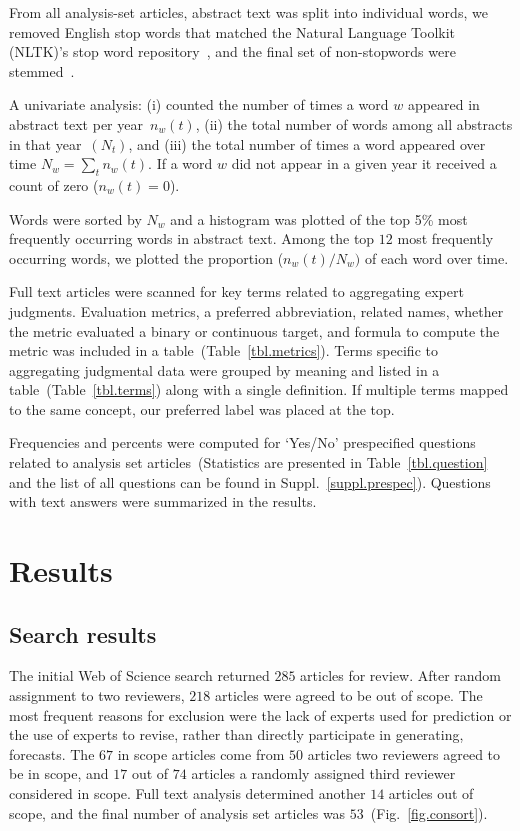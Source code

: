 \documentclass[preprint]{elsarticle}
\begin{document}
From all analysis-set articles, abstract text was split into individual words, we removed English stop words that matched the Natural Language Toolkit (NLTK)'s stop word repository~\cite{loper2002nltk}, and the final set of non-stopwords were stemmed~\cite{willett2006porter}.

A univariate analysis: (i) counted the number of times a word $w$ appeared in abstract text per year~$n_{w}(t)$, (ii) the total number of words among all abstracts in that year~$(N_{t})$, and (iii) the total number of times a word appeared over time $N_{w} = \sum_{t} n_{w}(t)$.
If a word $w$ did not appear in a given year it received a count of zero ($n_{w}(t)=0$).

Words were sorted by $N_{w}$ and a histogram was plotted of the top 5\% most frequently occurring words in abstract text.
Among the top $12$ most frequently occurring words, we plotted the proportion ($n_{w}(t)/N_{w})$ of each word over time.

Full text articles were scanned for key terms related to aggregating expert judgments.
Evaluation metrics, a preferred abbreviation, related names, whether the metric evaluated a binary or continuous target, and formula to compute the metric was included in a table~(Table~\ref{tbl.metrics}).  
Terms specific to aggregating judgmental data were grouped by meaning and listed in a table~(Table~\ref{tbl.terms}) along with a single definition.
If multiple terms mapped to the same concept, our preferred label was placed at the top. 

Frequencies and percents were computed for `Yes/No' prespecified questions related to analysis set articles~(Statistics are presented in Table~\ref{tbl.question} and the list of all questions can be found in Suppl.~\ref{suppl.prespec}).
Questions with text answers were summarized in the results. 

\section{Results}
\label{sec.results}

\subsection{Search results}

The initial Web of Science search returned $285$ articles for review.
After random assignment to two reviewers, $218$ articles were agreed  to be out of scope. 
The most frequent reasons for exclusion were the lack of experts used for prediction or the use of experts to revise, rather than directly participate in generating, forecasts.
The $67$ in scope articles come from $50$ articles two reviewers agreed to be in scope, and $17$ out of $74$ articles a randomly assigned third reviewer considered in scope.
Full text analysis determined another $14$ articles out of scope, and the final number of analysis set articles was $53$~(Fig.~\ref{fig.consort}).
\end{document}

